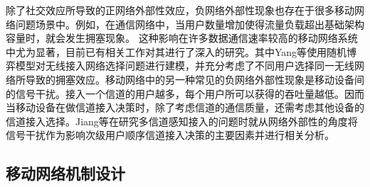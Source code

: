 除了社交效应所导致的正网络外部性效应，负网络外部性现象也存在于很多移动网络问题场景中。例如，在通信网络中，当用户数量增加使得流量负载超出基础架构容量时，就会发生拥塞现象。
这种影响在许多数据通信速率较高的移动网络系统中尤为显著，目前已有相关工作对其进行了深入的研究\cite{Asuman07,Fang09,Tran12,rayliu2,rayliu3}。其中Yang等\cite{rayliu2}使用随机博弈模型对无线接入网络选择问题进行建模，并充分考虑了不同用户选择同一无线网络所导致的拥塞效应。移动网络中的另一种常见的负网络外部性现象是移动设备间的信号干扰。接入一个信道的用户越多，每个用户所可以获得的吞吐量越低。因而当移动设备在做信道接入决策时，除了考虑信道的通信质量，还需考虑其他设备的信道接入选择。Jiang等\cite{rayliu1}在研究多信道感知接入的问题时就从网络外部性的角度将信号干扰作为影响次级用户顺序信道接入决策的主要因素并进行相关分析。

\iffalse
\subsection{移动网络机制设计}
